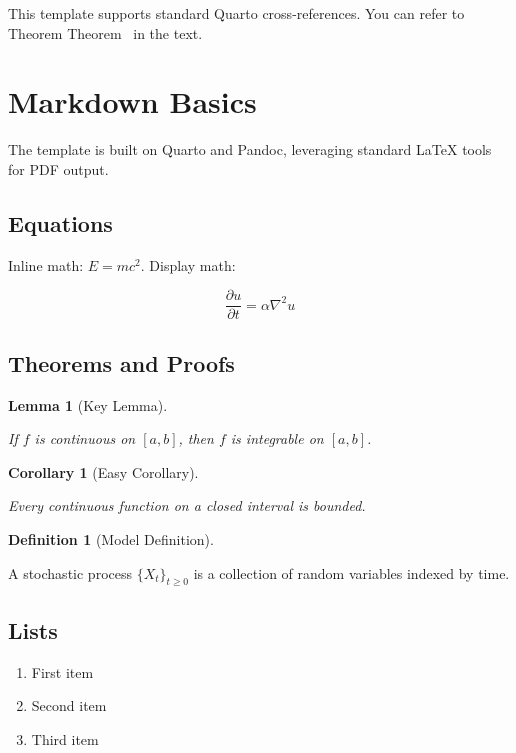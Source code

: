 \documentclass[
  11pt,
]{article}
\providecommand{\tightlist}{%
  \setlength{\itemsep}{0pt}\setlength{\parskip}{0pt}}
\let\quartoOldRef\ref
\renewcommand{\ref}[1]{%
    \IfBeginWith{#1}{eq-}{%
      \textup{(\quartoOldRef{#1})}%
    }{%
      \quartoOldRef{#1}%
    }%
  }%
\theoremstyle{plain}
\newtheorem{corollary}{Corollary}[section]
\theoremstyle{plain}
\newtheorem{lemma}{Lemma}[section]
\theoremstyle{plain}
\theoremstyle{definition}
\newtheorem{definition}{Definition}[section]
\theoremstyle{remark}
\begin{document}
This template supports standard Quarto cross-references. You can refer
to Theorem Theorem~\ref{thm-residue} in the text.

\section{Markdown Basics}\label{sec-markdown}

The template is built on Quarto and Pandoc, leveraging standard LaTeX
tools for PDF output.

\subsection{Equations}\label{equations}

Inline math: \(E = mc^2\). Display math:

\[
\frac{\partial u}{\partial t} = \alpha \nabla^2 u
\]

\subsection{Theorems and Proofs}\label{theorems-and-proofs}

\begin{lemma}[Key Lemma]\protect\hypertarget{lem-key}{}\label{lem-key}

If \(f\) is continuous on \([a,b]\), then \(f\) is integrable on
\([a,b]\).

\end{lemma}

\begin{corollary}[Easy
Corollary]\protect\hypertarget{cor-easy}{}\label{cor-easy}

Every continuous function on a closed interval is bounded.

\end{corollary}

\begin{definition}[Model
Definition]\protect\hypertarget{def-model}{}\label{def-model}

A stochastic process \(\{X_t\}_{t \ge 0}\) is a collection of random
variables indexed by time.

\end{definition}

\subsection{Lists}\label{lists}

\begin{enumerate}
\def\labelenumi{\arabic{enumi}.}
\tightlist
\item
  First item
\item
  Second item
\item
  Third item
\end{enumerate}
\end{document}
